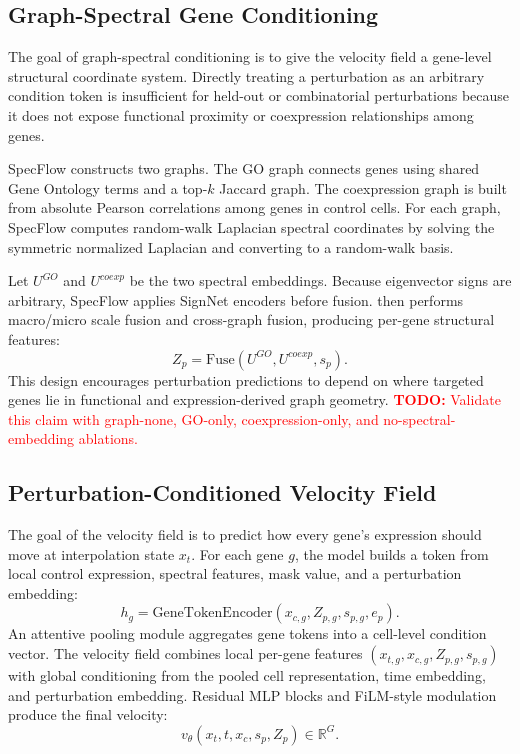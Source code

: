 \documentclass[11pt]{article}
\newcommand{\method}{SpecFlow}
\newcommand{\todo}[1]{\textcolor{red}{\textbf{TODO:} #1}}
\DeclareRobustCommand{\code}[1]{\texttt{\detokenize{#1}}}
\begin{document}
\subsection{Graph-Spectral Gene Conditioning}

The goal of graph-spectral conditioning is to give the velocity field a gene-level structural coordinate system.
Directly treating a perturbation as an arbitrary condition token is insufficient for held-out or combinatorial perturbations because it does not expose functional proximity or coexpression relationships among genes.

\method{} constructs two graphs.
The GO graph connects genes using shared Gene Ontology terms and a top-$k$ Jaccard graph.
The coexpression graph is built from absolute Pearson correlations among genes in control cells.
For each graph, \method{} computes random-walk Laplacian spectral coordinates by solving the symmetric normalized Laplacian and converting to a random-walk basis.

Let $U^{GO}$ and $U^{coexp}$ be the two spectral embeddings.
Because eigenvector signs are arbitrary, \method{} applies SignNet encoders before fusion.
\code{DualGraphSpectralFusion} then performs macro/micro scale fusion and cross-graph fusion, producing per-gene structural features:
\[
Z_p = \mathrm{Fuse}(U^{GO}, U^{coexp}, s_p).
\]
This design encourages perturbation predictions to depend on where targeted genes lie in functional and expression-derived graph geometry.
\todo{Validate this claim with graph-none, GO-only, coexpression-only, and no-spectral-embedding ablations.}

\subsection{Perturbation-Conditioned Velocity Field}

The goal of the velocity field is to predict how every gene's expression should move at interpolation state $x_t$.
For each gene $g$, the model builds a token from local control expression, spectral features, mask value, and a perturbation embedding:
\[
h_g = \mathrm{GeneTokenEncoder}(x_{c,g}, Z_{p,g}, s_{p,g}, e_p).
\]
An attentive pooling module aggregates gene tokens into a cell-level condition vector.
The velocity field combines local per-gene features $(x_{t,g}, x_{c,g}, Z_{p,g}, s_{p,g})$ with global conditioning from the pooled cell representation, time embedding, and perturbation embedding.
Residual MLP blocks and FiLM-style modulation produce the final velocity:
\[
v_\theta(x_t,t,x_c,s_p,Z_p) \in \mathbb{R}^{G}.
\]
\end{document}
